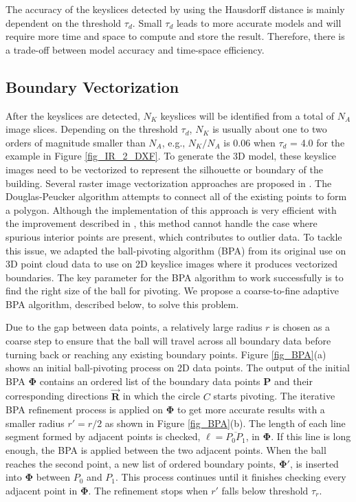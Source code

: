\documentclass{llncs}
\begin{document}
The accuracy of the keyslices detected by using the Hausdorff distance
is mainly dependent on the threshold $\tau_d$.
Small $\tau_d$ leads to more accurate models and will require more time and
space to compute and store the result.
Therefore, there is a trade-off between model accuracy and time-space
efficiency.

\subsection{Boundary Vectorization}
After the keyslices are detected, $N_K$ keyslices will be identified
from a total of $N_A$ image slices.
Depending on the threshold $\tau_{d}$, $N_K$ is usually about one to two
orders of magnitude smaller than $N_A$, e.g., $N_K/N_A$ is 0.06 when
$\tau_d$ = 4.0 for the example in
Figure \ref{fig_IR_2_DXF}.
To generate the 3D model, these keyslice images need to be vectorized to
represent the silhouette or boundary of the building.
Several raster image vectorization approaches are proposed in
\cite{DP_AAKMT,DP_DP}.
The Douglas-Peucker algorithm attempts to connect all of the existing points
to form a polygon.
Although the implementation of this approach is very efficient with the
improvement described in \cite{DP_HS}, this method cannot handle the case
where spurious interior points are present, which contributes to outlier data.
To tackle this issue, we adapted the ball-pivoting algorithm (BPA)
\cite{BPA_BMRS} from its original use on 3D point cloud data to use on
2D keyslice images where it produces vectorized boundaries.
The key parameter for the BPA algorithm to work successfully is to
find the right size of the ball for pivoting.
We propose a coarse-to-fine adaptive BPA algorithm, described below,
to solve this problem.

Due to the gap between data points, a relatively large radius $r$ is chosen
as a coarse step to ensure that the ball will travel across all boundary
data before turning back or reaching any existing boundary points.
Figure \ref{fig_BPA}(a) shows an initial ball-pivoting process on 2D
data points.
The output of the initial BPA $\boldsymbol{\Phi}$ contains an ordered list of the boundary data
points $\boldsymbol{P}$ and their corresponding directions $\overrightarrow{\boldsymbol{R}}$ in which
the circle $C$ starts pivoting.
The iterative BPA refinement process is applied on $\boldsymbol{\Phi}$ to get more accurate results with
a smaller radius $r'=r/2$ as shown in Figure \ref{fig_BPA}(b).
The length of each line segment formed by adjacent points
is checked, $\ell = \overline{P_0P_1}$, in $\boldsymbol{\Phi}$.
If this line is long enough, the BPA is applied between the two adjacent points.
When the ball reaches the second point, a new list of ordered boundary points,
$\boldsymbol{\Phi'}$, is inserted into $\boldsymbol{\Phi}$ between $P_0$ and $P_1$.
This process continues until it finishes checking every adjacent point in $\boldsymbol{\Phi}$.
The refinement stops when $r'$ falls below threshold $\tau_r$.
\end{document}
